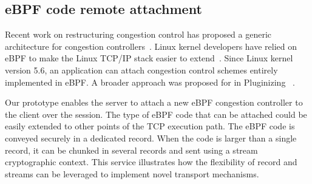 



\subsection{eBPF code remote attachment}
\label{sec:prot-ebpf}

Recent work on restructuring congestion control has proposed a generic
architecture for congestion controllers~\cite{narayan2018restructuring}.
Linux kernel developers have relied on eBPF to make the Linux TCP/IP
stack easier to extend~\cite{brakmo2017tcp,tran2020beyond}. Since Linux kernel
version 5.6, an application can attach congestion control schemes
entirely implemented in eBPF. A broader approach was proposed for \quic in
Pluginizing \quic~\cite{de2019pluginizing}.

Our \tcpls prototype enables the server %
to attach a new eBPF congestion controller to the client over the \tcpls
session. The type of eBPF code
that can be attached could be easily extended to other points of the TCP
execution path.
The eBPF code is conveyed securely in a dedicated \tcpls record. When
the code is larger than a single \tls record, it can be chunked in several
records and sent using a \tcpls stream cryptographic context. This service
illustrates how the flexibility of \tcpls record and streams can be leveraged
to implement novel transport mechanisms.

